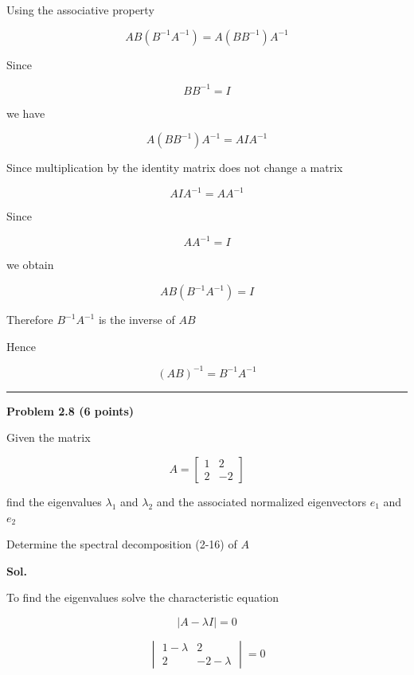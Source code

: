\documentclass[12pt]{article}
\begin{document}
\noindent
Using the associative property

\[
AB(B^{-1}A^{-1})
=
A(BB^{-1})A^{-1}
\]

\noindent
Since

\[
BB^{-1}=I
\]

\noindent
we have

\[
A(BB^{-1})A^{-1}
=
AIA^{-1}
\]

\noindent
Since multiplication by the identity matrix does not change a matrix

\[
AIA^{-1}
=
AA^{-1}
\]

\noindent
Since

\[
AA^{-1}=I
\]

\noindent
we obtain

\[
AB(B^{-1}A^{-1})
=
I
\]

\noindent
Therefore \(B^{-1}A^{-1}\) is the inverse of \(AB\)

\vspace{0.7cm}

\noindent
Hence

\[
\boxed{
(AB)^{-1}=B^{-1}A^{-1}
}
\]

\vspace{1cm}

\hrule

\vspace{0.7cm}

\noindent
\textbf{Problem 2.8 (6 points)}

\vspace{0.5cm}

\noindent
Given the matrix

\[
A=
\begin{bmatrix}
1 & 2\\
2 & -2
\end{bmatrix}
\]

\noindent
find the eigenvalues \(\lambda_1\) and \(\lambda_2\) and the associated normalized eigenvectors \(e_1\) and \(e_2\)

\noindent
Determine the spectral decomposition (2-16) of \(A\)

\vspace{0.5cm}

\noindent
\textbf{Sol.}

\vspace{0.3cm}

\noindent
To find the eigenvalues solve the characteristic equation

\[
|A-\lambda I|=0
\]

\[
\begin{vmatrix}
1-\lambda & 2\\
2 & -2-\lambda
\end{vmatrix}
=0
\]
\end{document}
